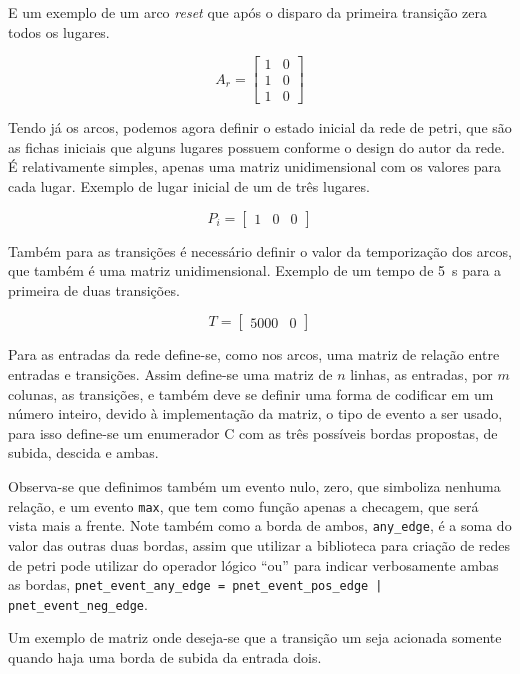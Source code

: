 E um exemplo de um arco \textit{reset} que após o disparo da primeira transição zera todos os lugares.

$$ A_r =
\begin{bmatrix}
	 1 & 0\\
	 1 & 0\\
	 1 & 0
\end{bmatrix}
$$

Tendo já os arcos, podemos agora definir o estado inicial da rede de petri, que são as fichas iniciais que alguns lugares possuem conforme o design do autor da rede. É relativamente simples, apenas uma matriz unidimensional com os valores para cada lugar. Exemplo de lugar inicial de um de três lugares.

$$
P_i = 
\begin{bmatrix}
	 1 & 0 & 0
\end{bmatrix}
$$

Também para as transições é necessário definir o valor da temporização dos arcos, que também é uma matriz unidimensional. Exemplo de um tempo de \SI{5}{s} para a primeira de duas transições.

$$
T = 
\begin{bmatrix}
	 5000 & 0
\end{bmatrix}
$$

Para as entradas da rede define-se, como nos arcos, uma matriz de relação entre entradas e transições. Assim define-se uma matriz de $n$ linhas, as entradas, por $m$ colunas, as transições, e também deve se definir uma forma de codificar em um número inteiro, devido à implementação da matriz, o tipo de evento a ser usado, para isso define-se um enumerador C com as três possíveis bordas propostas, de subida, descida e ambas.



Observa-se que definimos também um evento nulo, zero, que simboliza nenhuma relação, e um evento \lstinline{max}, que tem como função apenas a checagem, que será vista mais a frente. Note também como a borda de ambos, \lstinline{any_edge}, é a soma do valor das outras duas bordas, assim que utilizar a biblioteca para criação de redes de petri pode utilizar do operador lógico ``ou'' para indicar verbosamente ambas as bordas, \lstinline{pnet_event_any_edge = pnet_event_pos_edge | pnet_event_neg_edge}.

Um exemplo de matriz onde deseja-se que a transição um seja acionada somente quando haja uma borda de subida da entrada dois.

